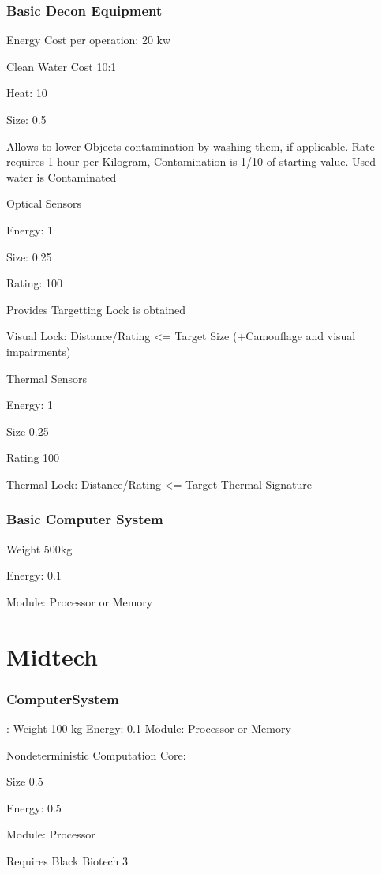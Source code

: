 \subsubsection{Basic Decon Equipment}
Energy Cost per operation: 20 kw \par
Clean Water Cost 10:1\par
Heat: 10 \par
Size: 0.5\par
Allows to lower Objects contamination by washing them, if applicable.
Rate requires 1 hour per Kilogram, Contamination is 1/10 of starting value.
Used water is Contaminated\par

Optical Sensors\par
Energy: 1\par
Size: 0.25 \par
Rating: 100\par
Provides Targetting Lock is obtained\par
Visual Lock: Distance/Rating <= Target Size (+Camouflage and visual impairments)\par

Thermal Sensors\par
Energy: 1\par
Size 0.25\par
Rating 100\par
Thermal Lock: Distance/Rating <= Target Thermal Signature\par

\subsubsection{Basic Computer System}\par
Weight 500kg\par
Energy: 0.1\par
Module: Processor or Memory\par
\par
\section{Midtech}\label{sec:midtech}
\subsubsection{ComputerSystem}:
Weight 100 kg
Energy: 0.1
Module: Processor or Memory\par

Nondeterministic Computation Core:\par
Size 0.5\par
Energy: 0.5\par
Module: Processor\par
Requires Black Biotech 3\par

